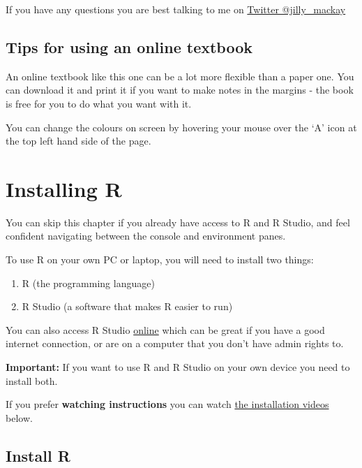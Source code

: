 \documentclass[
]{book}
\providecommand{\tightlist}{%
  \setlength{\itemsep}{0pt}\setlength{\parskip}{0pt}}
\begin{document}
If you have any questions you are best talking to me on \href{https://twitter.com/jilly_mackay}{Twitter @jilly\_mackay}

\hypertarget{usetips}{%
\section{Tips for using an online textbook}\label{usetips}}

An online textbook like this one can be a lot more flexible than a paper one. You can download it and print it if you want to make notes in the margins - the book is free for you to do what you want with it.

You can change the colours on screen by hovering your mouse over the `A' icon at the top left hand side of the page.

\hypertarget{install}{%
\chapter{Installing R}\label{install}}

\begin{los}
You can skip this chapter if you already have access to R and R Studio,
and feel confident navigating between the console and environment panes.
\end{los}

To use R on your own PC or laptop, you will need to install two things:

\begin{enumerate}
\def\labelenumi{\arabic{enumi}.}
\tightlist
\item
  R (the programming language)
\item
  R Studio (a software that makes R easier to run)
\end{enumerate}

You can also access R Studio \protect\hyperlink{install_rsc}{online} which can be great if you have a good internet connection, or are on a computer that you don't have admin rights to.

\textbf{Important:} If you want to use R and R Studio on your own device you need to install both.

If you prefer \textbf{watching instructions} you can watch \protect\hyperlink{install_vids}{the installation videos} below.

\hypertarget{install_r}{%
\section{Install R}\label{install_r}}
\end{document}
